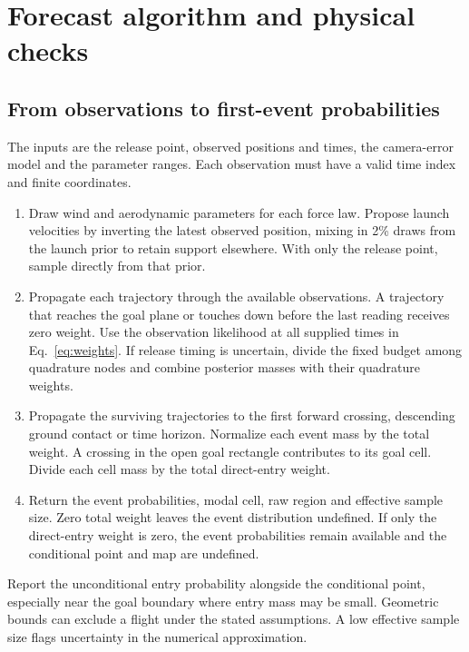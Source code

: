 \clearpage
\section{Forecast algorithm and physical checks}
\label{app:algorithm}
\subsection{From observations to first-event probabilities}
The inputs are the release point, observed positions and times, the camera-error model and the parameter ranges. Each observation must have a valid time index and finite coordinates.

\begin{enumerate}
\item Draw wind and aerodynamic parameters for each force law. Propose launch velocities by inverting the latest observed position, mixing in 2\% draws from the launch prior to retain support elsewhere. With only the release point, sample directly from that prior.
\item Propagate each trajectory through the available observations. A trajectory that reaches the goal plane or touches down before the last reading receives zero weight. Use the observation likelihood at all supplied times in Eq.~\eqref{eq:weights}. If release timing is uncertain, divide the fixed budget among quadrature nodes and combine posterior masses with their quadrature weights.
\item Propagate the surviving trajectories to the first forward crossing, descending ground contact or time horizon. Normalize each event mass by the total weight. A crossing in the open goal rectangle contributes to its goal cell. Divide each cell mass by the total direct-entry weight.
\item Return the event probabilities, modal cell, raw region and effective sample size. Zero total weight leaves the event distribution undefined. If only the direct-entry weight is zero, the event probabilities remain available and the conditional point and map are undefined.
\end{enumerate}

Report the unconditional entry probability alongside the conditional point, especially near the goal boundary where entry mass may be small. Geometric bounds can exclude a flight under the stated assumptions. A low effective sample size flags uncertainty in the numerical approximation.

